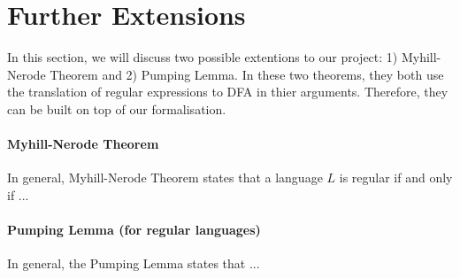 \section{Further Extensions}
\par In this section, we will discuss two possible extentions to
our project: 1) Myhill-Nerode Theorem and 2) Pumping Lemma. In these two
theorems, they both use the translation of regular expressions to DFA
in thier arguments. Therefore, they can be built on top of our
formalisation. 


\paragraph{Myhill-Nerode Theorem} In general, Myhill-Nerode Theorem
states that a language \(L\) is regular if and only if ... 


\paragraph{Pumping Lemma (for regular languages)} In general, the Pumping Lemma states that ...